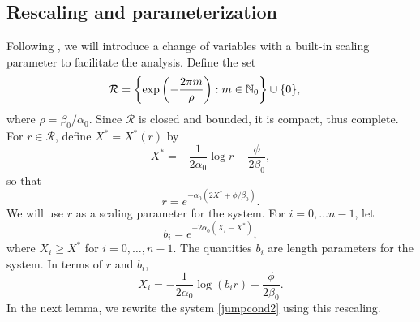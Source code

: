 \documentclass[12pt]{elsarticle}
\theoremstyle{plain}
\theoremstyle{definition}
\theoremstyle{remark}
\numberwithin{theorem}{section}
\numberwithin{equation}{section}
\begin{document}
\subsection{Rescaling and parameterization}

Following \cite[Section 6]{Sandstede1998}, we will introduce a change of variables with a built-in scaling parameter to facilitate the analysis. Define the set
\begin{align}
\mathcal{R} &= \left\{ \mathop\mathrm{exp}\nolimits\left(-\frac{2 \pi m}{\rho}\right) : m \in \mathbb{N}_0 \right\} \cup \{ 0 \},
\end{align}
where $\rho = \beta_0 / \alpha_0$. Since $\mathcal{R}$ is closed and bounded, it is compact, thus complete. For $r \in \mathcal{R}$, define $X^* = X^*(r)$ by 
\begin{equation}\label{Xstar}
X^* = -\frac{1}{2\alpha_0}\log r - \frac{\phi}{2\beta_0},
\end{equation}
so that
\begin{equation}\label{defr}
r = e^{-\alpha_0(2X^* + \phi/\beta_0)}.
\end{equation}
We will use $r$ as a scaling parameter for the system. For $i = 0, \dots n-1$, let
\begin{equation}\label{bjscale}
b_i = e^{-2 \alpha_0 (X_i - X^*)},
\end{equation}
where $X_i \geq X^*$ for $i = 0, \dots, n-1$. The quantities $b_i$ are length parameters for the system. In terms of $r$ and $b_i$,
\begin{equation}\label{Xiscale}
X_i = -\frac{1}{2\alpha_0}\log(b_i r) - \frac{\phi}{2 \beta_0}.
\end{equation}
In the next lemma, we rewrite the system \cref{jumpcond2} using this rescaling.
\end{document}
